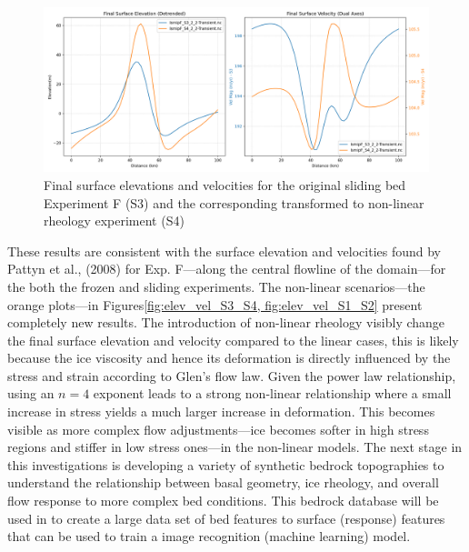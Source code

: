 \begin{figure}[H]
    \includegraphics[scale=0.40]{combined_elevation_detrended_surface_velocity_['S3']_['S4'].png}
    \caption{Final surface elevations and velocities for the original sliding bed Experiment F (S3) and the corresponding transformed to non-linear rheology experiment (S4)}
    \label{fig:elev_vel_S3_S4}
\end{figure}
These results are consistent with the surface elevation and velocities found by Pattyn et al., (2008) for Exp. F—along the central flowline of the domain—for the both the frozen and sliding experiments. The non-linear scenarios—the orange plots—in Figures\ref{fig:elev_vel_S3_S4, fig:elev_vel_S1_S2} present completely new results.
The introduction of non-linear rheology visibly change the final surface elevation and velocity compared to the linear cases, this is likely because the ice viscosity and hence its deformation is directly influenced by the stress and strain according to Glen's flow law. Given the power law relationship, using an $n = 4$ exponent leads to a strong non-linear relationship where a small increase in stress yields a much larger increase in deformation. This becomes visible as more complex flow adjustments—ice becomes softer in high stress regions and stiffer in low stress ones—in the non-linear models.
The next stage in this investigations is developing a variety of synthetic bedrock topographies to understand the relationship between basal geometry, ice rheology, and overall flow response to more complex bed conditions. This bedrock database will be used in to create a large data set of bed features to surface (response) features that can be used to train a image recognition (machine learning) model.%
\newpage
